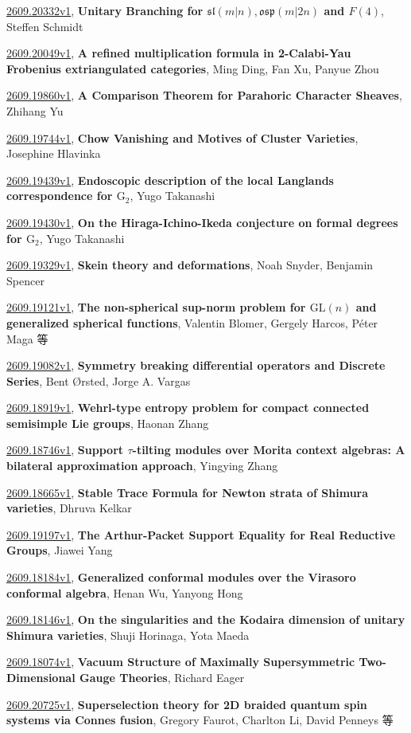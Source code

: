 \documentclass[9pt, a4paper]{article}
\theoremstyle{plain}
\theoremstyle{definition}
\theoremstyle{remark}
\newcommand{\arxiv}[3]{\href{https://arxiv.org/abs/#1}{#1}, \textbf{\textcolor{arxivblue}{#2}}, #3}
\begin{document}
\arxiv{2609.20332v1}{Unitary Branching for $\mathfrak{sl}(m\vert n), \mathfrak{osp}(m\vert 2n)$ and $F(4)$}{Steffen Schmidt}

\arxiv{2609.20049v1}{A refined multiplication formula in 2-Calabi-Yau Frobenius extriangulated categories}{Ming Ding, Fan Xu, Panyue Zhou}

\arxiv{2609.19860v1}{A Comparison Theorem for Parahoric Character Sheaves}{Zhihang Yu}

\arxiv{2609.19744v1}{Chow Vanishing and Motives of Cluster Varieties}{Josephine Hlavinka}

\arxiv{2609.19439v1}{Endoscopic description of the local Langlands correspondence for $\mathrm{G}_2$}{Yugo Takanashi}

\arxiv{2609.19430v1}{On the Hiraga-Ichino-Ikeda conjecture on formal degrees for $\mathrm{G_2}$}{Yugo Takanashi}

\arxiv{2609.19329v1}{Skein theory and deformations}{Noah Snyder, Benjamin Spencer}

\arxiv{2609.19121v1}{The non-spherical sup-norm problem for $\mathrm{GL}(n)$ and generalized spherical functions}{Valentin Blomer, Gergely Harcos, Péter Maga 等}

\arxiv{2609.19082v1}{Symmetry breaking differential operators and Discrete Series}{Bent Ørsted, Jorge A. Vargas}

\arxiv{2609.18919v1}{Wehrl-type entropy problem for compact connected semisimple Lie groups}{Haonan Zhang}

\arxiv{2609.18746v1}{Support $τ$-tilting modules over Morita context algebras: A bilateral approximation approach}{Yingying Zhang}

\arxiv{2609.18665v1}{Stable Trace Formula for Newton strata of Shimura varieties}{Dhruva Kelkar}

\arxiv{2609.19197v1}{The Arthur-Packet Support Equality for Real Reductive Groups}{Jiawei Yang}

\arxiv{2609.18184v1}{Generalized conformal modules over the Virasoro conformal algebra}{Henan Wu, Yanyong Hong}

\arxiv{2609.18146v1}{On the singularities and the Kodaira dimension of unitary Shimura varieties}{Shuji Horinaga, Yota Maeda}

\arxiv{2609.18074v1}{Vacuum Structure of Maximally Supersymmetric Two-Dimensional Gauge Theories}{Richard Eager}

\arxiv{2609.20725v1}{Superselection theory for 2D braided quantum spin systems via Connes fusion}{Gregory Faurot, Charlton Li, David Penneys 等}
\end{document}
